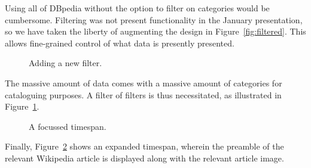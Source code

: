 Using all of DBpedia without the option to filter on categories would be 
cumbersome. Filtering was not present functionality in the January 
presentation, so we have taken the liberty of augmenting the design in 
Figure~\ref{fig:filtered}. This allows fine-grained control of what data is 
presently presented.

\begin{figure}[H]
  \centering
  \begin{scale}{0.5}
    
  \end{scale}
  \caption{Adding a new filter.}
  \label{fig:filters}
\end{figure}

The massive amount of data comes with a massive amount of categories for 
cataloguing purposes. A filter of filters is thus necessitated, as illustrated 
in Figure~\ref{fig:filters}.

\begin{figure}[H]
  \centering
  \begin{scale}{0.3}
    
  \end{scale}
  \caption{A focussed timespan.}
  \label{fig:focussed}
\end{figure}

Finally, Figure~\ref{fig:focussed} shows an expanded timespan, wherein the 
preamble of the relevant Wikipedia article is displayed along with the 
relevant article image.
